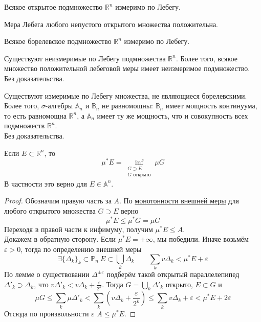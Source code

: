 \documentclass{article}
\let\eps\varepsilon
\begin{document}
    \begin{corollary}
        Всякое открытое подмножество $\mathbb R^n$ измеримо по Лебегу.
    \end{corollary}
    \begin{corollary}
        Мера Лебега любого непустого открытого множества положительна.
    \end{corollary}
    \begin{corollary}
        Всякое борелевское подмножество $\mathbb R^n$ измеримо по Лебегу.
    \end{corollary}
    \begin{claim}
        Существуют неизмеримые по Лебегу подмножества $\mathbb R^n$. Более того, всякое множество положительной лебеговой меры имеет неизмеримое подмножество.\\
        Без доказательства.
    \end{claim}
    \begin{claim}
        Существуют измеримые по Лебегу множества, не являющиеся борелевскими. Более того, $\sigma$-алгебры $\mathbb A_n$ и $\mathbb B_n$ не равномощны: $\mathbb B_n$ имеет мощность континуума, то есть равномощна $\mathbb R^n$, а $\mathbb A_n$ имеет ту же мощность, что и совокупность всех подмножеств $\mathbb R^n$.\\
        Без доказательства.
    \end{claim}
    \begin{theorem}
        Если $E\subset\mathbb R^n$, то
        $$
        \mu^*E=\inf\limits_{\substack{G\supset E\\G\text{ открыто}}}\mu G
        $$
        В частности это верно для $E\in\mathbb A^n$.
    \end{theorem}
    \begin{proof}
        Обозначим правую часть за $A$. По \hyperref[Монотонность внешней меры]{монотонности внешней меры} для любого открытого множества $G\supset E$ верно
        $$
        \mu^*E\leqslant\mu^*G=\mu G
        $$
        Переходя в правой части к инфимуму, получим $\mu^*E\leqslant A$.\\
        Докажем в обратную сторону. Если $\mu^*E=+\infty$, мы победили. Иначе возьмём $\eps>0$, тогда по определению внешней меры
        $$
        \exists\{\Delta_k\}_k\subset\mathbb P_n~E\subset\bigcup\limits_k\Delta_k\qquad\sum\limits_kv\Delta_k<\mu^*E+\eps
        $$
        По лемме о существовании $\Delta^{\pm\eps}$ подберём такой открытый параллелепипед $\Delta'_k\supset\Delta_k$, что $v\Delta'_k<v\Delta_k+\frac\eps{2^k}$. Тогда $G=\bigcup\limits_k\Delta'_k$ открыто, $E\subset G$ и
        $$
        \mu G\leqslant\sum\limits_k\mu\Delta'_k<\sum\limits_k\left(v\Delta_k+\frac\eps{2^k}\right)\leqslant\sum\limits_kv\Delta_k+\eps<\mu^*E+2\eps
        $$
        Отсюда по произвольности $\eps$ $A\leqslant\mu^*E$.
    \end{proof}
\end{document}
